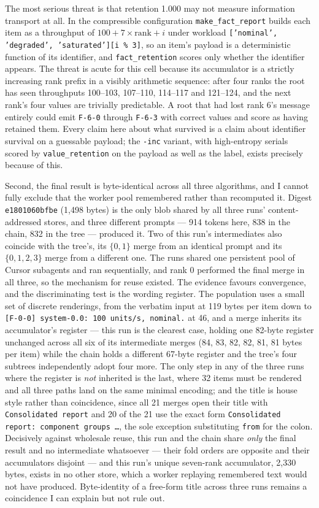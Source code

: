 \documentclass[11pt]{article}
\begin{document}
The most serious threat is that retention 1.000 may not measure information transport at
all. In the compressible configuration \texttt{make\_fact\_report} builds each item as a
throughput of $100 + 7 \times \text{rank} + i$ under workload
\texttt{['nominal', 'degraded', 'saturated'][i \% 3]}, so an item's payload is a
deterministic function of its identifier, and \texttt{fact\_retention} scores only
whether the identifier appears. The threat is acute for this cell because its accumulator
is a strictly increasing rank prefix in a visibly arithmetic sequence: after four ranks
the root has seen throughputs 100--103, 107--110, 114--117 and 121--124, and the next
rank's four values are trivially predictable. A root that had lost rank 6's message
entirely could emit \texttt{F-6-0} through \texttt{F-6-3} with correct values and score
as having retained them. Every claim here about what survived is a claim about
identifier survival on a guessable payload; the \texttt{-inc} variant, with high-entropy
serials scored by \texttt{value\_retention} on the payload as well as the label, exists
precisely because of this.

Second, the final result is byte-identical across all three algorithms, and I cannot
fully exclude that the worker pool remembered rather than recomputed it. Digest
\texttt{e1801060bfbe} (1{,}498 bytes) is the only blob shared by all three runs'
content-addressed stores, and three different prompts --- 914 tokens here, 838 in the
chain, 832 in the tree --- produced it. Two of this run's intermediates also coincide with
the tree's, its $\{0,1\}$ merge from an identical prompt and its $\{0,1,2,3\}$ merge from
a different one. The runs shared one persistent pool of Cursor subagents and ran
sequentially, and rank 0 performed the final merge in all three, so the mechanism for
reuse existed. The evidence favours convergence, and the discriminating test is the
wording register. The population uses a small set of discrete renderings, from the
verbatim input at 119 bytes per item down to \texttt{[F-0-0] system-0.0: 100 units/s,
nominal.} at 46, and a merge inherits its accumulator's register --- this run is the
clearest case, holding one 82-byte register unchanged across all six of its intermediate
merges (84, 83, 82, 82, 81, 81 bytes per item) while the chain holds a different 67-byte
register and the tree's four subtrees independently adopt four more. The only step in any
of the three runs where the register is \emph{not} inherited is the last, where 32 items
must be rendered and all three paths land on the same minimal encoding; and the title is
house style rather than coincidence, since all 21 merges open their title with
\texttt{Consolidated report} and 20 of the 21 use the exact form
\texttt{Consolidated report: component groups \dots}, the sole exception substituting
\texttt{from} for the colon.
Decisively against wholesale reuse, this run and the chain share \emph{only} the final
result and no intermediate whatsoever --- their fold orders are opposite and their
accumulators disjoint --- and this run's unique seven-rank accumulator, 2{,}330 bytes,
exists in no other store, which a worker replaying remembered text would not have
produced. Byte-identity of a free-form title across three runs remains a coincidence I
can explain but not rule out.
\end{document}

